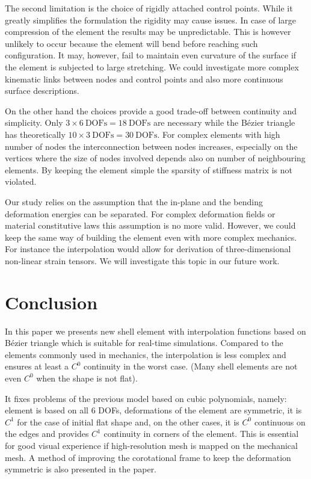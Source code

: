 \documentclass{egpubl}
\begin{document}
The second limitation is the choice of rigidly attached control points. 
While it greatly simplifies the formulation the rigidity may cause issues.
In case of large compression of the element the results may be
unpredictable. This is however unlikely to occur because the element will
bend before reaching such configuration. It may, however, fail to maintain
even curvature of the surface if the element is subjected to large
stretching.
We could investigate more complex kinematic links between nodes and control points 
and also more continuous surface descriptions.

On the other hand the choices provide a good trade-off between continuity
and simplicity. Only $ 3 \times 6~\mathrm{DOFs} = 18~\mathrm{DOFs}$ are
necessary while the B\'ezier triangle has theoretically $ 10 \times
3~\mathrm{DOFs} = 30~\mathrm{DOFs}$. For complex elements with high number
of nodes the interconnection between nodes increases, especially on the
vertices where the size of nodes involved depends also on number of
neighbouring elements. By keeping the element simple the sparsity of
stiffness matrix is not violated.

Our study relies on the assumption that the in-plane and the bending deformation energies can be separated.
For complex deformation fields or material constitutive laws  this assumption is no more valid.
However, we could keep the same way of building the element even with more complex mechanics. 
For instance the interpolation would allow for derivation of three-dimensional non-linear strain tensors.
We will investigate this topic in our future work.


\section{Conclusion} %

In this paper we presents new shell element with interpolation functions
based on B\'ezier triangle which is  suitable for real-time simulations.
Compared to  the elements commonly used in mechanics, the interpolation is less complex and ensures at least a $C^0$ continuity in the worst case. 
(Many shell elements are not even $C^0$ when the shape is not flat).

It fixes problems of the previous model \cite{Comas2010c} based on cubic
polynomials, namely: element is based on all 6 DOFs, deformations of the
element are symmetric, it is $C^1$ for the case of initial flat shape and, on
the other cases, it is $C^0$ continuous on the edges and provides $C^1$
continuity in corners of the element. This is essential for good visual
experience if high-resolution mesh is mapped on the mechanical mesh. A method
of improving the corotational frame to keep the deformation symmetric is also
presented in the paper.
\end{document}

